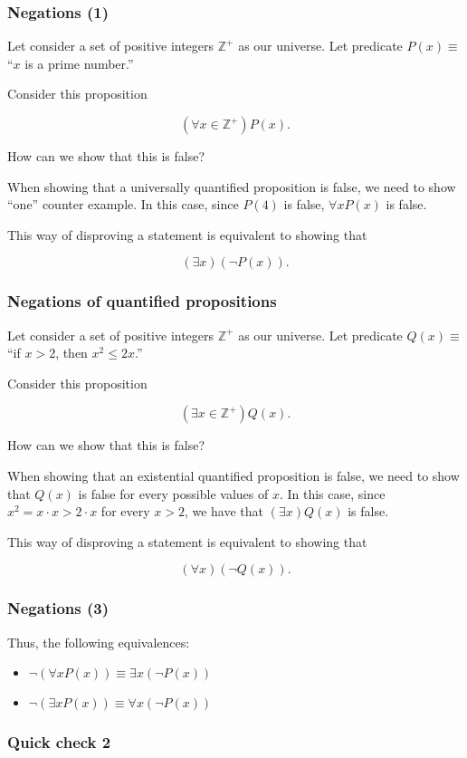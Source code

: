 \begin{frame}\frametitle{Negations (1)}
  Let consider a set of positive integers $\mathbb Z^+$ as our
  universe.  Let predicate $P(x)\equiv$ ``$x$ is a prime number.''

  Consider this proposition

  \[(\forall x\in {\mathbb Z^+}) P(x).\]

  How can we show that this is false? \pause

  When showing that a universally quantified proposition is false, we
  need to show ``one'' counter example.  In this case, since $P(4)$ is
  false, $\forall x P(x)$ is false.  \pause

  This way of disproving a statement is equivalent to showing that

  \[(\exists x)(\neg P(x)).\]
\end{frame}

\begin{frame}\frametitle{Negations of quantified propositions}
  Let consider a set of positive integers $\mathbb Z^+$ as our
  universe.  Let predicate $Q(x)\equiv$ ``if $x > 2$, then  $x^2\leq 2x$.''

  Consider this proposition

  \[(\exists x\in {\mathbb Z^+}) Q(x).\]

  How can we show that this is false? \pause

  When showing that an existential quantified proposition is false, we
  need to show that $Q(x)$ is false for every possible values of $x$.
  In this case, since $x^2 = x\cdot x > 2\cdot x$ for every $x>2$, we
  have that $(\exists x) Q(x)$ is false. \pause

  This way of disproving a statement is equivalent to showing that

  \[(\forall x)(\neg Q(x)).\]
\end{frame}

\begin{frame}\frametitle{Negations (3)}
  Thus, the following equivalences:

  \begin{itemize}
  \item $\neg(\forall x P(x)) \equiv \exists x (\neg P(x))$
  \item $\neg(\exists x P(x)) \equiv \forall x (\neg P(x))$
  \end{itemize}
\end{frame}

\begin{frame}\frametitle{Quick check 2}
\end{frame}

